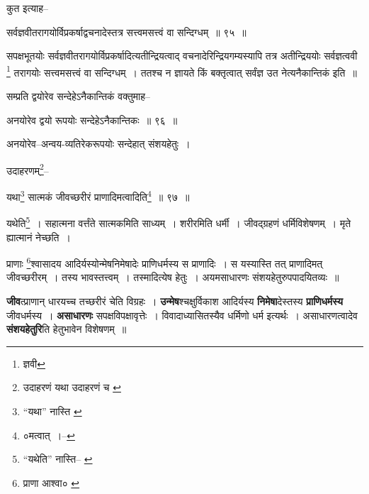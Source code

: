 \documentclass[article,12pt,a4paper]{memoir}
\begin{document}
	  \pstart कुत इत्याह--
	\pend
       
	  \bigskip
	  \begingroup
	

	  \pstart सर्वज्ञवीतरागयोर्विप्रकर्षाद्वचनादेस्तत्र सत्त्वमसत्त्वं वा सन्दिग्धम् ॥ ९५ ॥
	\pend
      
	  \endgroup
	 

	  \pstart सपक्षभूतयोः सर्वज्ञवीतरागयोर्विप्रकर्षादित्यतीन्द्रियत्वाद् वचनादेरिन्द्रियगम्यस्यापि तत्र अतीन्द्रिययोः सर्वज्ञत्ववी \footnote{ज्ञवी} तरागयोः सत्त्वमसत्त्वं वा सन्दिग्धम् । ततश्च न ज्ञायते किं बक्तृत्वात् सर्वंज्ञ उत नेत्यनैकान्तिकं इति ॥
	\pend
       

	  \pstart सम्प्रति द्वयोरेव सन्देहेऽनैकान्तिकं वक्तुमाह--
	\pend
       
	  \bigskip
	  \begingroup
	

	  \pstart अनयोरेव द्वयो रूपयोः सन्देहेऽनैकान्तिकः ॥ ९६ ॥
	\pend
      
	  \endgroup
	 

	  \pstart अनयोरेव--अन्वय-व्यतिरेकरूपयोः सन्देहात् संशयहेतुः ।
	\pend
       

	  \pstart उदाहरणम्\footnote{उदाहरणं यथा \cite{dp-msD} उदाहरणं च \cite{dp-msC}}\---
	\pend
       
	  \bigskip
	  \begingroup
	

	  \pstart यथा\footnote{“यथा” नास्ति \cite{dp-msB} \cite{dp-msC} \cite{dp-msD} \cite{dp-edP} \cite{dp-edH}} सात्मकं जीवच्छरीरं प्राणादिमत्वादिति\footnote{०मत्वात् ।--\cite{dp-msC}} ॥ ९७ ॥
	\pend
      
	  \endgroup
	 

	  \pstart यथेति\footnote{“यथेति” नास्ति--\cite{dp-msA} \cite{dp-msB} \cite{dp-msC} \cite{dp-msD} \cite{dp-edP} \cite{dp-edH} \cite{dp-edN}} । सहात्मना वर्त्तंते सात्मकमिति साध्यम् । शरीरमिति धर्मी । जीवद्ग्रहणं धर्मिविशेषणम् । मृते ह्यात्मानं नेच्छति ।
	\pend
       

	  \pstart प्राणाः \footnote{प्राणा आश्वा० \cite{dp-msA} \cite{dp-msB} \cite{dp-edP} \cite{dp-edH} \cite{dp-edE} \cite{dp-edN}}\-श्वासादय आदिर्यस्योन्मेषनिमेषादेः प्राणिधर्मस्य स प्राणादिः । स यस्यास्ति तत् प्राणादिमत् जीवच्छरीरम् । तस्य भावस्तत्त्वम् । तस्मादित्येष हेतुः । अयमसाधारणः संशयहेतुरुपपादयितव्यः ॥
	\pend
      
	  \endgroup
	

	  \pstart \textbf{जीव}त्प्राणान् धारयच्च तच्छरीरं चेति विग्रहः । \textbf{उन्मेष}श्चक्षुर्विकाश आदिर्यस्य \textbf{निमेषा}देस्तस्य \textbf{प्राणिधर्मस्य} जीवधर्मस्य । \textbf{असाधारणः} सपक्षविपक्षावृत्तेः । विवादाध्यासितस्यैव धर्मिणो धर्म इत्यर्थः । असाधारणत्वादेव \textbf{संशयहेतुरि}ति हेतुभावेन विशेषणम् ॥
	\pend
	  \bigskip
	  \begingroup
	
\end{document}
